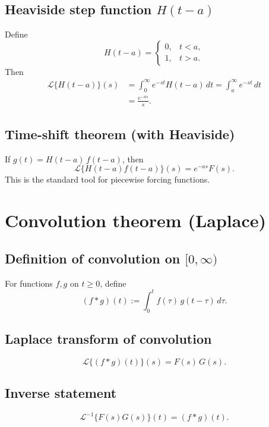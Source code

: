 \subsection{Heaviside step function $H(t-a)$}
Define
\[
H(t-a)=
\begin{cases}
0, & t<a,\\
1, & t>a.
\end{cases}
\]
Then
\begin{align}
\mathcal{L}\{H(t-a)\}(s)
&= \int_0^\infty e^{-st}H(t-a)\,dt
= \int_a^\infty e^{-st}\,dt\\
&= \boxed{\frac{e^{-as}}{s}}.
\end{align}

\subsection{Time-shift theorem (with Heaviside)}
If $g(t)=H(t-a)\,f(t-a)$, then
\begin{equation}
\boxed{
\mathcal{L}\{H(t-a)f(t-a)\}(s)=e^{-as}F(s).
}
\end{equation}
This is the standard tool for piecewise forcing functions.


\section{Convolution theorem (Laplace)}

\subsection{Definition of convolution on $[0,\infty)$}
For functions $f,g$ on $t\ge 0$, define
\begin{equation}
(f*g)(t) := \int_0^t f(\tau)\,g(t-\tau)\,d\tau.
\end{equation}

\subsection{Laplace transform of convolution}
\begin{equation}
\boxed{
\mathcal{L}\{(f*g)(t)\}(s)=F(s)\,G(s).
}
\end{equation}

\subsection{Inverse statement}
\begin{equation}
\boxed{
\mathcal{L}^{-1}\{F(s)G(s)\}(t)=(f*g)(t).
}
\end{equation}


